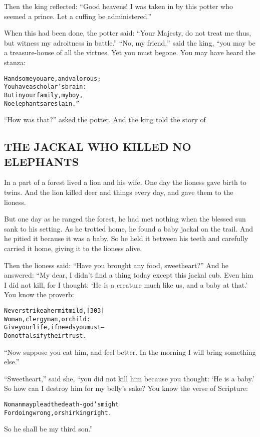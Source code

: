 \documentclass{article}
\renewenvironment{verbatim}{\begin{alltt}\normalfont\begin{centering}}{\end{centering}\end{alltt}}
\begin{document}
Then the king reflected:
``Good heavens! I was taken in by this potter who seemed a prince. Let a cuffing be administered.''

When this had been done, the potter said:
``Your Majesty, do not treat me thus, but witness my adroitness in battle.''
``No, my friend,'' said the king, “you may be a treasure-house of
all the virtues. Yet you must begone. You may have heard the
stanza:

\begin{verbatim}
Handsome you are, and valorous;
    You have a scholar's brain:
But in your family, my boy,
    No elephants are slain.”
\end{verbatim}
``How was that?'' asked the potter. And the king told the story of

\subsection{THE JACKAL WHO KILLED NO ELEPHANTS}

In a part of a forest lived a lion and his wife. One day the
lioness gave birth to twins. And the lion killed deer and things
every day, and gave them to the lioness.

But one day as he ranged the forest, he had met nothing when the
blessed sun sank to his setting. As he trotted home, he found a
baby jackal on the trail. And he pitied it because it was a baby.
So he held it between his teeth and carefully carried it home,
giving it to the lioness alive.

Then the lioness said: ``Have you brought any food, sweetheart?''
And he answered: “My dear, I didn't find a thing today except this
jackal cub. Even him I did not kill, for I thought:
`He is a creature much like us, and a baby at that.' You know the
proverb:

\begin{verbatim}
Never strike a hermit mild,                             [303]
Woman, clergyman, or child:
Give your life, if needs you must--
Do not falsify their trust.
\end{verbatim}
``Now suppose you eat him, and feel better. In the morning I will bring something else.''

``Sweetheart,'' said she, “you did not kill him because you
thought: `He is a baby.' So how can I destroy him for my belly's
sake? You know the verse of Scripture:

\begin{verbatim}
No man may plead the death-god's might
For doing wrong, or shirking right.
\end{verbatim}
So he shall be my third son.”
\end{document}
